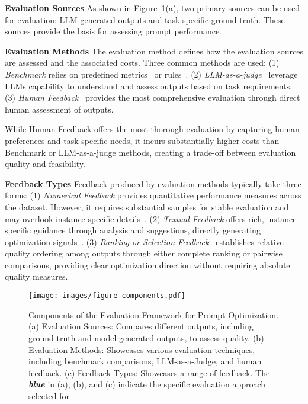 \textbf{Evaluation Sources}
As shown in Figure~\ref{fig:components}(a), two primary sources can be used for evaluation: LLM-generated outputs and task-specific ground truth. These sources provide the basis for assessing prompt performance.


\textbf{Evaluation Methods}
The evaluation method defines how the evaluation sources are assessed and the associated costs. Three common methods are used:
(1) \textit{Benchmark} relies on predefined metrics~\cite{mirac2023bbh, david2023gpqa} or rules~\cite{yong2024promst}. 
(2) \textit{LLM-as-a-judge}~\cite{lianmin2023mtbench} leverage LLMs capability to understand and assess outputs based on task requirements. 
(3) \textit{Human Feedback}~\cite{lin2024apohf} provides the most comprehensive evaluation through direct human assessment of outputs.

While Human Feedback offers the most thorough evaluation by capturing human preferences and task-specific needs, it incurs substantially higher costs than Benchmark or LLM-as-a-judge methods, creating a trade-off between evaluation quality and feasibility.


\textbf{Feedback Types}
Feedback produced by evaluation methods typically take three forms:
(1) \textit{Numerical Feedback} provides quantitative performance measures across the dataset. However, it requires substantial samples for stable evaluation and may overlook instance-specific details~\cite{zhang2024aflow}. 
(2) \textit{Textual Feedback} offers rich, instance-specific guidance through analysis and suggestions, directly generating optimization signals~\cite{mert2024textgrad}.
(3) \textit{Ranking or Selection Feedback}~\cite{yin2024pair} establishes relative quality ordering among outputs through either complete ranking or pairwise comparisons, providing clear optimization direction without requiring absolute quality measures.

\begin{figure}[t!]
	\centering
	\texttt{[image: images/figure-components.pdf]}
        \vspace{-2em}
	\caption{Components of the Evaluation Framework for Prompt Optimization. (a) Evaluation Sources: Compares different outputs, including ground truth and model-generated outputs, to assess quality.
(b) Evaluation Methods: Showcases various evaluation techniques, including benchmark comparisons, LLM-as-a-Judge, and human feedback.
(c) Feedback Types: Showcases a range of feedback.
The \textit{\textcolor{bleudefrance}{\textbf{blue}}} in (a), (b), and (c) indicate the specific evaluation approach selected for \ours.
}
	\label{fig:components}
\end{figure}

